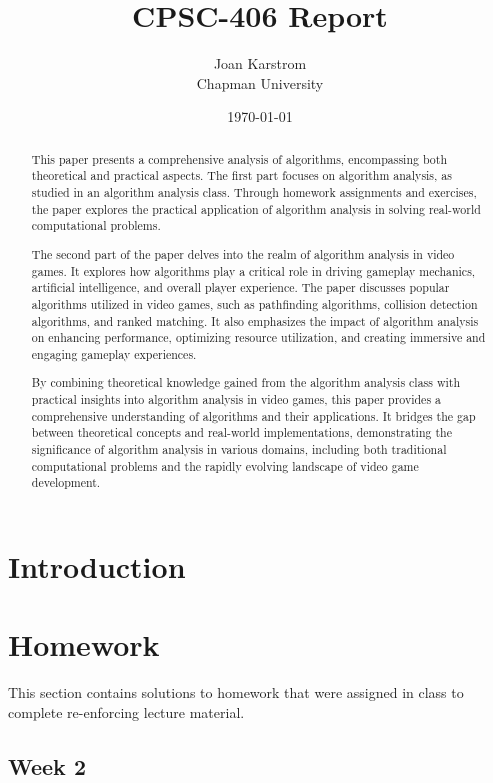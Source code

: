 \documentclass{article}
\title{CPSC-406 Report}
\author{Joan Karstrom \\ Chapman University}
\date{\today}
\theoremstyle{theorem}
\theoremstyle{definition}
\theoremstyle{remark}
\begin{document}
\maketitle

\begin{abstract}
This paper presents a comprehensive analysis of algorithms, encompassing both theoretical and practical aspects. The first part focuses on algorithm analysis, as studied in an algorithm analysis class. Through homework assignments and exercises, the paper explores the practical application of algorithm analysis in solving real-world computational problems.

The second part of the paper delves into the realm of algorithm analysis in video games. It explores how algorithms play a critical role in driving gameplay mechanics, artificial intelligence, and overall player experience. The paper discusses popular algorithms utilized in video games, such as pathfinding algorithms, collision detection algorithms, and ranked matching. It also emphasizes the impact of algorithm analysis on enhancing performance, optimizing resource utilization, and creating immersive and engaging gameplay experiences.

By combining theoretical knowledge gained from the algorithm analysis class with practical insights into algorithm analysis in video games, this paper provides a comprehensive understanding of algorithms and their applications. It bridges the gap between theoretical concepts and real-world implementations, demonstrating the significance of algorithm analysis in various domains, including both traditional computational problems and the rapidly evolving landscape of video game development.

\end{abstract}

\tableofcontents

\section{Introduction}\label{intro}

\section{Homework}\label{homework}

This section contains solutions to homework that were assigned in class to complete re-enforcing lecture material.

\subsection{Week 2}
\end{document}
